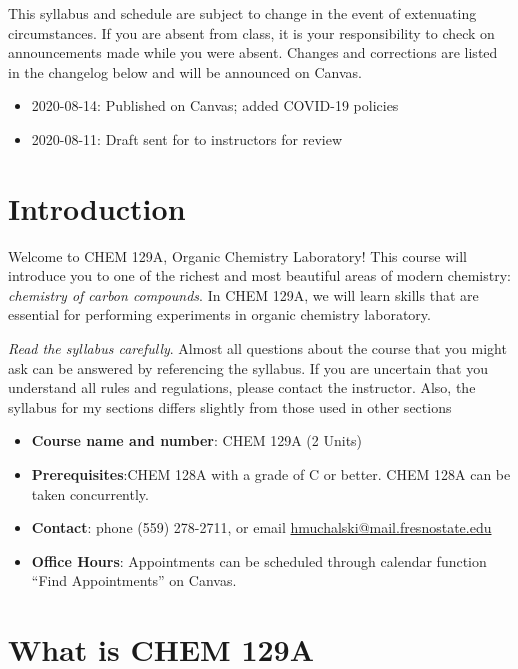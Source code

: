 This syllabus and schedule are subject to change in the event of
extenuating circumstances. If you are absent from class, it is your
responsibility to check on announcements made while you were absent.
Changes and corrections are listed in the changelog below and will be
announced on Canvas.

\begin{itemize}
\tightlist
\item
  2020-08-14: Published on Canvas; added COVID-19 policies
\item
  2020-08-11: Draft sent for to instructors for review
\end{itemize}

\newpage

\hypertarget{introduction}{%
\section{Introduction}\label{introduction}}

Welcome to CHEM 129A, Organic Chemistry Laboratory! This course will
introduce you to one of the richest and most beautiful areas of modern
chemistry: \emph{chemistry of carbon compounds}. In CHEM 129A, we will
learn skills that are essential for performing experiments in organic
chemistry laboratory.

\emph{Read the syllabus carefully}. Almost all questions about the
course that you might ask can be answered by referencing the syllabus.
If you are uncertain that you understand all rules and regulations,
please contact the instructor. Also, the syllabus for my sections
differs slightly from those used in other sections

\begin{itemize}
\tightlist
\item
  \textbf{Course name and number}: CHEM 129A (2 Units)
\item
  \textbf{Prerequisites}:CHEM 128A with a grade of C or better. CHEM
  128A can be taken concurrently.
\item
  \textbf{Contact}: phone (559) 278-2711, or email
  \url{hmuchalski@mail.fresnostate.edu}
\item
  \textbf{Office Hours}: Appointments can be scheduled through calendar
  function ``Find Appointments'' on Canvas.
\end{itemize}

\hypertarget{what-is-chem-129a}{%
\section{What is CHEM 129A}\label{what-is-chem-129a}}

